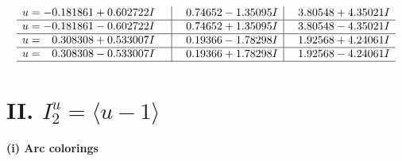 \documentclass[1p]{elsarticle_modified}
\theoremstyle{definition}
\begin{document}
$$\begin{array}{c|c|c}
\begin{aligned}
u &= -0.181861 + 0.602722 I\end{aligned}
 & \phantom{-}0.74652 - 1.35095 I & \phantom{-}3.80548 + 4.35021 I \\ \hline\begin{aligned}
u &= -0.181861 - 0.602722 I\end{aligned}
 & \phantom{-}0.74652 + 1.35095 I & \phantom{-}3.80548 - 4.35021 I \\ \hline\begin{aligned}
u &= \phantom{-}0.308308 + 0.533007 I\end{aligned}
 & \phantom{-}0.19366 - 1.78298 I & \phantom{-}1.92568 + 4.24061 I \\ \hline\begin{aligned}
u &= \phantom{-}0.308308 - 0.533007 I\end{aligned}
 & \phantom{-}0.19366 + 1.78298 I & \phantom{-}1.92568 - 4.24061 I\\
 \hline 
 \end{array}$$\newpage\newpage\renewcommand{\arraystretch}{1}
\centering \section*{II. $I^u_{2}= \langle u-1 \rangle$}
\flushleft \textbf{(i) Arc colorings}\\
\end{document}
